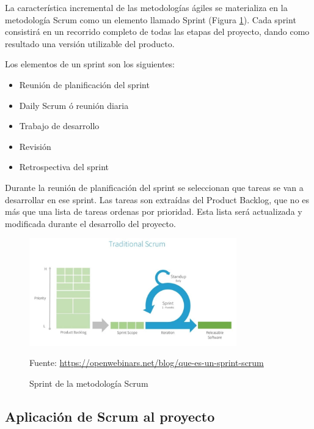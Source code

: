 La característica incremental de las metodologías ágiles se materializa en la metodología Scrum como un elemento llamado Sprint (Figura \ref{fig:sprint_scrum}). Cada sprint consistirá en un recorrido completo de todas las etapas del proyecto, dando como resultado una versión utilizable del producto.

Los elementos de un sprint son los siguientes:

\begin{itemize}
    \item Reunión de planificación del sprint
    \item Daily Scrum ó reunión diaria
    \item Trabajo de desarrollo
    \item Revisión
    \item Retrospectiva del sprint
\end{itemize}

Durante la reunión de planificación del sprint se seleccionan que tareas se van a desarrollar en ese sprint. Las tareas son extraídas del Product Backlog, que no es más que una lista de tareas ordenas por prioridad. Esta lista será actualizada y modificada durante el desarrollo del proyecto.

\begin{figure}[h]
    \centering
    \includegraphics[width=0.8\textwidth]{imagenes/03_Planificacion/sprint_scrum.jpg}
    \begin{center}
        Fuente: \url{https://openwebinars.net/blog/que-es-un-sprint-scrum}
    \end{center}
    \caption{Sprint de la metodología Scrum}
    \label{fig:sprint_scrum}
\end{figure}


\subsection{Aplicación de Scrum al proyecto}

